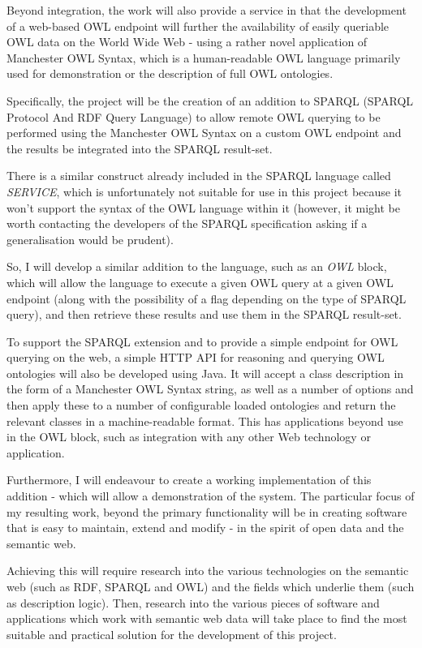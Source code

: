 \documentclass{article}
\begin{document}
Beyond integration, the work will also provide a service in that the development
of a web-based OWL endpoint will further the availability of easily queriable
OWL data on the World Wide Web - using a rather novel application of Manchester
OWL Syntax, which is a human-readable OWL language primarily used for
demonstration or the description of full OWL ontologies.

Specifically, the project will be the creation of an addition to
SPARQL\cite{sparql} (SPARQL Protocol And RDF Query Language) to allow remote
OWL\cite{owlprimer} querying to be performed using the Manchester OWL Syntax 
on a custom OWL endpoint and the results be integrated into the SPARQL result-set.

There is a similar construct already included in the SPARQL language called
\emph{SERVICE}, which is unfortunately not suitable for use in this project
because it won't support the syntax of the OWL language within it (however, it
might be worth contacting the developers of the SPARQL specification asking if a
generalisation would be prudent).

So, I will develop a similar addition to the language, such as an \emph{OWL}
block, which will allow the language to execute a given OWL query at a given
OWL endpoint (along with the possibility of a flag depending on the type of
SPARQL query), and then retrieve these results and use them in the SPARQL
result-set.

To support the SPARQL extension and to provide a simple endpoint for OWL
querying on the web, a simple HTTP API for reasoning and querying OWL ontologies
will also be developed using Java. It will accept a class description in the
form of a Manchester OWL Syntax string, as well as a number of options and then
apply these to a number of configurable loaded ontologies and return the
relevant classes in a machine-readable format. This has applications beyond use
in the OWL block, such as integration with any other Web technology or
application.

Furthermore, I will endeavour to create a working implementation of this
addition - which will allow a demonstration of the system. The particular 
focus of my resulting work, beyond the primary functionality
will be in creating software that is easy to maintain, extend and modify - in
the spirit of open data and the semantic web.

Achieving this will require research into the various technologies on the
semantic web (such as RDF, SPARQL and OWL) and the fields which underlie them
(such as description logic). Then, research into the various pieces of software
and applications which work with semantic web data will take place to find the
most suitable and practical solution for the development of this project.
\end{document}
